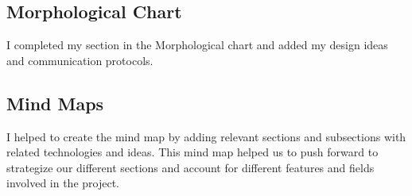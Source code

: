 \subsection{Morphological Chart}

I completed my section in the Morphological chart and added my design ideas and communication protocols.

\subsection{Mind Maps}

I helped to create the mind map by adding relevant sections and subsections with related technologies and ideas. This mind map helped us to push forward to strategize our different sections and account for different features and fields involved in the project.
